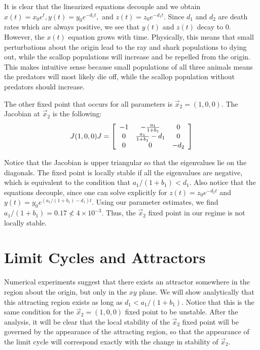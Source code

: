 \documentclass[%
        final,
        notitlepage,
        narroweqnarray,
        inline,
        ]{ieee}
\begin{document}
It is clear that the linearized equations decouple and we obtain $x(t) = x_0 e^t, y(t) = y_0 e^{-d_1 t},$ and $ z(t) = z_0 e^{-d_1 t}$. Since $d_1$ and $d_2$ are death rates which are always positive, we see that $y(t)$ and $z(t)$ decay to 0. However, the $x(t)$ equation grows with time. Physically, this means that small perturbations about the origin lead to the ray and shark populations to dying out, while the scallop populations will increase and be repelled from the origin. This makes intuitive sense because small populations of all three animals means the predators will most likely die off, while the scallop population without predators should increase. 

The other fixed point that occurs for all parameters is $\vec{x}_2 = (1,0,0)$. The Jacobian at $\vec{x}_2$ is the following:
\begin{equation}
J(1,0,0)J = \left[ \begin{array}{ c c c}
-1 & -\frac{a_1}{1 + b_1} & 0 \\
0 & \frac{a_1}{1 + b_1} - d_1 & 0 \\
0 & 0 & -d_2 
\end{array} \right]
\end{equation}

Notice that the Jacobian is upper triangular so that the eigenvalues lie on the diagonals. The fixed point is locally stable if all the eigenvalues are negative, which is equivalent to the condition that $a_1/(1 + b_1) < d_1$.  Also notice that the equations decouple, since one can solve explicitly for $z(t) = z_0 e^{-d_2 t}$ and $y(t) = y_0 e^{(a_1/(1 + b_1) - d_1) t}$. Using our parameter estimates, we find $a_1 / (1 + b_1) = 0.17 \not < 4 \times 10^{-3}$. Thus, the $\vec{x}_2$ fixed point in our regime is not locally stable. 

\section{Limit Cycles and Attractors}

Numerical experiments suggest that there exists an attractor somewhere in the region about the origin, but only in the $xy$ plane. We will show analytically that this attracting region exists as long as $d_1 < a_1 / (1 + b_1)$. Notice that this is the same condition for the $\vec{x}_2 = (1,0,0)$ fixed point to be unstable. After the analysis, it will be clear that the local stability of the $\vec{x}_2$ fixed point will be governed by the appearance of the attracting region, so that the appearance of the limit cycle will correspond exactly with the change in stability of $\vec{x}_2$. 
\end{document}
